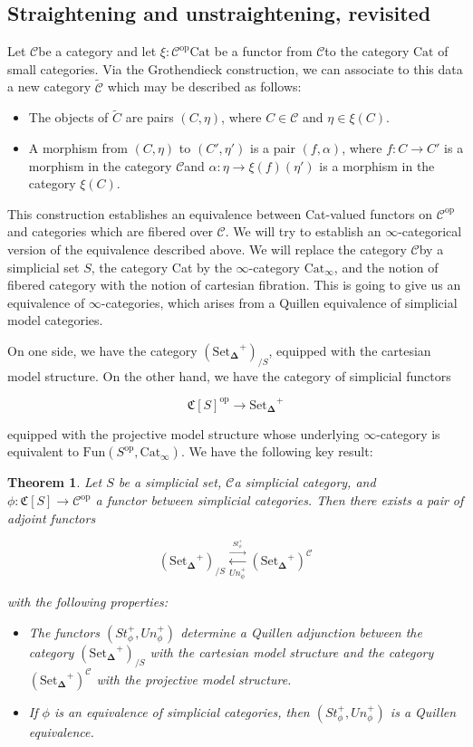 \documentclass[12pt]{amsart}
\newcommand{\8}{\ensuremath{\infty}}
\newcommand{\C}{\ensuremath{\mathscr{C}}}
\newcommand{\SSet}{\ensuremath{\text{Set}_{\boldsymbol{\Delta}}}}
\newcommand{\op}[1]{\ensuremath{{#1}^{\text{op}}}}
\newcommand{\adj}[2]{\ensuremath{\overset{\overset{#1}{ \rightarrow}}{\underset{#2}{\leftarrow}}}}
\newtheorem{theorem}{Theorem}
\begin{document}
\subsection{Straightening and unstraightening, revisited}
Let \C be a category and let $\xi: \op\C\text{Cat}$ be a functor from \C to the category $\text{Cat}$ of small categories. Via the Grothendieck construction, we can associate to this data a new category $\tilde{\C}$ which may be described as follows:

\begin{itemize}
  \item The objects of $\tilde{C}$ are pairs $(C, \eta)$, where $C \in \C$ and $\eta \in \xi(C)$.
  \item A morphism from $(C, \eta)$ to $(C', \eta')$ is a pair $(f, \alpha)$, where $f: C \rightarrow C'$ is a morphism in the category \C and $\alpha: \eta \rightarrow \xi(f)(\eta')$ is a morphism in the category $\xi(C)$.
\end{itemize}

This construction establishes an equivalence between Cat-valued functors on $\op\C$ and categories which are fibered over $\C$. We will try to establish an \8-categorical version of the equivalence described above. We will replace the category \C by a simplicial set $S$, the category Cat by the \8-category $\text{Cat}_{\8}$, and the notion of fibered category with the notion of cartesian fibration. This is going to give us an equivalence of \8-categories, which arises from a Quillen equivalence of simplicial model categories.

On one side, we have the category $(\SSet^+)_{/S}$, equipped with the cartesian model structure. On the other hand, we have the category of simplicial functors

$$
  \op{\mathfrak{C}[S]} \rightarrow \SSet^+
$$

equipped with the projective model structure whose underlying \8-category is equivalent to $\text{Fun}(\op{S}, \text{Cat}_\8). $ We have the following key result:

\begin{theorem}
  Let $S$ be a simplicial set, \C a simplicial category, and $\phi: \mathfrak{C}[S] \rightarrow \op\C$ a functor between simplicial categories. Then there exists a pair of adjoint functors

  $$
    (\SSet^+)_{/S} \adj{St_\phi^+}{Un_\phi^+} (\SSet^+)^\C
  $$

  with the following properties:

  \begin{itemize}
    \item[(1)] The functors $(St_\phi^+, Un_\phi^+)$ determine a Quillen adjunction between the category $(\SSet^+)_{/S}$ with the cartesian model structure and the category $(\SSet^+)^\C$ with the projective model structure.
    \item[(2)] If $\phi$ is an equivalence of simplicial categories, then $(St_\phi^+, Un_\phi^+)$ is a Quillen equivalence.
  \end{itemize}
\end{theorem}
\end{document}
